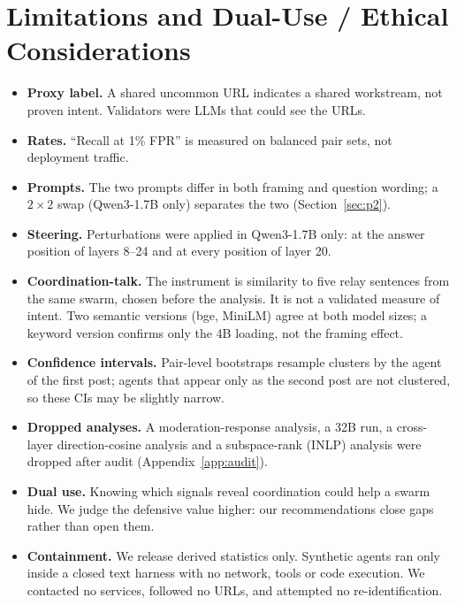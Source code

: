 \documentclass[10.5pt]{article}
\begin{document}
\section{Limitations and Dual-Use / Ethical Considerations}
\label{app:limits}
\begin{itemize}
\item \textbf{Proxy label.} A shared uncommon URL indicates a shared workstream, not proven intent. Validators were LLMs that could see the URLs.
\item \textbf{Rates.} ``Recall at 1\% FPR'' is measured on balanced pair sets, not deployment traffic.
\item \textbf{Prompts.} The two prompts differ in both framing and question wording; a $2\times2$ swap (Qwen3-1.7B only) separates the two (Section~\ref{sec:p2}).
\item \textbf{Steering.} Perturbations were applied in Qwen3-1.7B only: at the answer position of layers 8--24 and at every position of layer 20.
\item \textbf{Coordination-talk.} The instrument is similarity to five relay sentences from the same swarm, chosen before the analysis. It is not a validated measure of intent. Two semantic versions (bge, MiniLM) agree at both model sizes; a keyword version confirms only the 4B loading, not the framing effect.
\item \textbf{Confidence intervals.} Pair-level bootstraps resample clusters by the agent of the first post; agents that appear only as the second post are not clustered, so these CIs may be slightly narrow.
\item \textbf{Dropped analyses.} A moderation-response analysis, a 32B run, a cross-layer direction-cosine analysis and a subspace-rank (INLP) analysis were dropped after audit (Appendix~\ref{app:audit}).
\item \textbf{Dual use.} Knowing which signals reveal coordination could help a swarm hide. We judge the defensive value higher: our recommendations close gaps rather than open them.
\item \textbf{Containment.} We release derived statistics only. Synthetic agents ran only inside a closed text harness with no network, tools or code execution. We contacted no services, followed no URLs, and attempted no re-identification.
\end{itemize}
\end{document}
